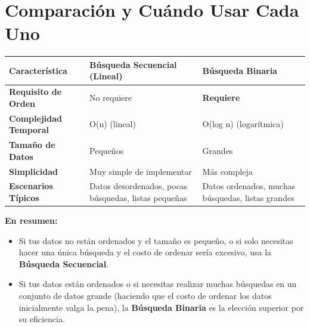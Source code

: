 \documentclass[
  spanish,
  letterpaper,
  DIV=11,
  numbers=noendperiod]{scrreprt}
\newcounter{none} %
\providecommand{\tightlist}{%
  \setlength{\itemsep}{0pt}\setlength{\parskip}{0pt}}
\begin{document}
\section{Comparación y Cuándo Usar Cada
Uno}\label{comparaciuxf3n-y-cuuxe1ndo-usar-cada-uno}

{\def\LTcaptype{none} %
\begin{longtable}[]{@{}
  >{\raggedright\arraybackslash}p{}
  >{\raggedright\arraybackslash}p{}
  >{\raggedright\arraybackslash}p{}@{}}
\toprule\noalign{}
\begin{minipage}[b]{\linewidth}\raggedright
Característica
\end{minipage} & \begin{minipage}[b]{\linewidth}\raggedright
Búsqueda Secuencial (Lineal)
\end{minipage} & \begin{minipage}[b]{\linewidth}\raggedright
Búsqueda Binaria
\end{minipage} \\
\midrule\noalign{}
\endhead
\bottomrule\noalign{}
\endlastfoot
\textbf{Requisito de Orden} & No requiere & \textbf{Requiere} \\
\textbf{Complejidad Temporal} & O(n) (lineal) & O(log n)
(logarítmica) \\
\textbf{Tamaño de Datos} & Pequeños & Grandes \\
\textbf{Simplicidad} & Muy simple de implementar & Más compleja \\
\textbf{Escenarios Típicos} & Datos desordenados, pocas búsquedas,
listas pequeñas & Datos ordenados, muchas búsquedas, listas grandes \\
\end{longtable}
}

\textbf{En resumen:}

\begin{itemize}
\tightlist
\item
  Si tus datos no están ordenados y el tamaño es pequeño, o si solo
  necesitas hacer una única búsqueda y el costo de ordenar sería
  excesivo, usa la \textbf{Búsqueda Secuencial}.
\item
  Si tus datos están ordenados o si necesitas realizar muchas búsquedas
  en un conjunto de datos grande (haciendo que el costo de ordenar los
  datos inicialmente valga la pena), la \textbf{Búsqueda Binaria} es la
  elección superior por su eficiencia.
\end{itemize}
\end{document}
